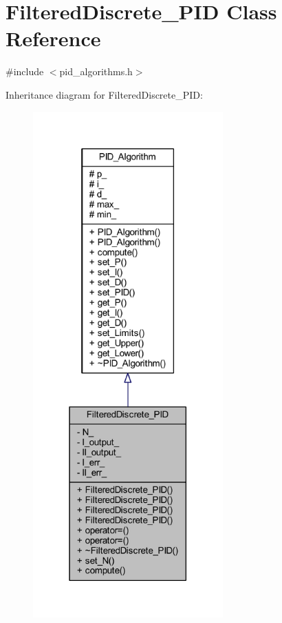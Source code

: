 \hypertarget{class_filtered_discrete___p_i_d}{}\section{Filtered\+Discrete\+\_\+\+P\+ID Class Reference}
\label{class_filtered_discrete___p_i_d}


{\ttfamily \#include $<$pid\+\_\+algorithms.\+h$>$}



Inheritance diagram for Filtered\+Discrete\+\_\+\+P\+ID\+:
\nopagebreak
\begin{figure}[H]
\begin{center}
\leavevmode
\includegraphics[height=550pt]{class_filtered_discrete___p_i_d__inherit__graph}
\end{center}
\end{figure}


